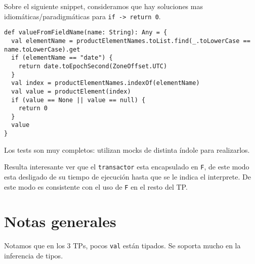 \documentclass{article}
\begin{document}
Sobre el siguiente snippet, consideramos que hay soluciones mas idiomáticas/paradigmáticas para \texttt{if -> return 0}.

\begin{verbatim}
def valueFromFieldName(name: String): Any = {
  val elementName = productElementNames.toList.find(_.toLowerCase == name.toLowerCase).get
  if (elementName == "date") {
    return date.toEpochSecond(ZoneOffset.UTC)
  }
  val index = productElementNames.indexOf(elementName)
  val value = productElement(index)
  if (value == None || value == null) {
    return 0
  }
  value
}
\end{verbatim}

Los tests son muy completos: utilizan mocks de distinta índole para realizarlos.

Resulta interesante ver que el \texttt{transactor} esta encapsulado en \texttt{F}, de este modo esta desligado de su tiempo de ejecución hasta que se le indica el interprete. De este modo es consistente con el uso de \texttt{F} en el resto del TP.

\section{Notas generales}
Notamos que en los 3 TPs, pocos \texttt{val} están tipados. Se soporta mucho en la inferencia de tipos.
\end{document}
